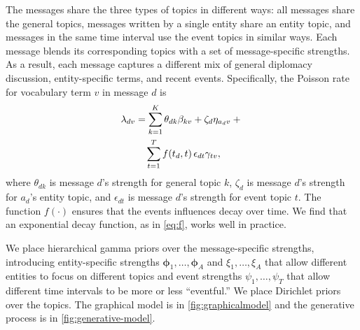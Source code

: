 The messages share the three types of topics in different ways: all
messages share the general topics, messages written by a single entity
share an entity topic, and messages in the same time interval use the
event topics in similar ways. Each message blends its corresponding
topics with a set of message-specific strengths. As a result, each
message captures a different mix of general diplomacy discussion,
entity-specific terms, and recent events. Specifically, the Poisson
rate for vocabulary term $v$ in message $d$ is
\begin{align}
  \lambda_{dv} &= \sum_{k=1}^K \theta_{dk} \beta_{kv}  + \zeta_d
  \eta_{a_dv} + {}\notag \\
  &\quad
  \sum_{t=1}^T f(t_d, t)\, \epsilon_{dt} \gamma_{tv},
\label{eq:poisrate}
\end{align}
where $\theta_{dk}$ is message $d$'s strength for general topic $k$,
$\zeta_{d}$ is message $d$'s strength for $a_d$'s entity topic, and
$\epsilon_{dt}$ is message $d$'s strength for event topic $t$. The
function $f(\cdot)$ ensures that the events influences decay over
time. We find that an exponential decay function, as in
\cref{eq:f}, works well in practice.

We place hierarchical gamma priors over the message-specific
strengths, introducing entity-specific strengths $\mathbold{\phi}_1,
\ldots, \mathbold{\phi}_A$ and $\xi_1, \ldots, \xi_A$ that allow
different entities to focus on different topics and event strengths
$\psi_1, \ldots, \psi_T$ that allow different time intervals to be
more or less ``eventful.'' We place Dirichlet priors over the
topics. The graphical model is in \cref{fig:graphicalmodel} and the
generative process is in \cref{fig:generative-model}.

